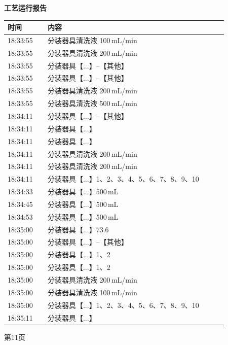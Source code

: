\documentclass[UTF8,10pt,a4paper,fontset=fandol]{ctexart}
\begin{document}
\noindent
\begin{minipage}[t]{0.47\linewidth}
\centering
\textbf{工艺运行报告}

\vspace{2pt}
\scriptsize
\begin{tabular}{|p{0.16\linewidth}|p{0.72\linewidth}|}
\hline
时间 & 内容 \\ \hline
18:33:55 & 分装器具清洗液 100\,mL/min \\ \hline
18:33:55 & 分装器具清洗液 200\,mL/min \\ \hline
18:33:55 & 分装器具【...】--【其他】 \\ \hline
18:33:55 & 分装器具【...】--【其他】 \\ \hline
18:33:55 & 分装器具清洗液 200\,mL/min \\ \hline
18:33:55 & 分装器具清洗液 500\,mL/min \\ \hline
18:34:11 & 分装器具【...】--【其他】 \\ \hline
18:34:11 & 分装器具【...】 \\ \hline
18:34:11 & 分装器具【...】 \\ \hline
18:34:11 & 分装器具清洗液 200\,mL/min \\ \hline
18:34:11 & 分装器具清洗液 200\,mL/min \\ \hline
18:34:11 & 分装器具【...】1、2、3、4、5、6、7、8、9、10 \\ \hline
18:34:33 & 分装器具【...】500\,mL \\ \hline
18:34:45 & 分装器具【...】500\,mL \\ \hline
18:34:53 & 分装器具【...】500\,mL \\ \hline
18:35:00 & 分装器具【...】73.6 \\ \hline
18:35:00 & 分装器具【...】--【其他】 \\ \hline
18:35:00 & 分装器具【...】1、2 \\ \hline
18:35:00 & 分装器具【...】1、2 \\ \hline
18:35:00 & 分装器具清洗液 200\,mL/min \\ \hline
18:35:00 & 分装器具清洗液 100\,mL/min \\ \hline
18:35:00 & 分装器具【...】1、2、3、4、5、6、7、8、9、10 \\ \hline
18:35:11 & 分装器具【...】 \\ \hline
\end{tabular}

\vspace{2pt}
\tiny 第11页
\end{minipage}
\hfill
\end{document}
